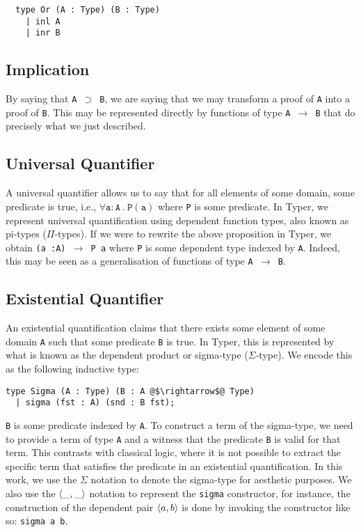 \documentclass[12pt,twoside,maitrise]{dms}
\theoremstyle{definition}
\numberwithin{equation}{section}
\numberwithin{table}{chapter}
\numberwithin{figure}{chapter}
\newcommand\id[1] {\texttt{#1}}
\newcommand\fn[1] {\texttt{#1}}
\begin{document}
\begin{verbatim}
  type Or (A : Type) (B : Type)
    | inl A
    | inr B
\end{verbatim}

\subsection*{Implication}

By saying that \fn{A $\supset$ B}, we are saying that we may transform a proof
of \id{A} into a proof of \id{B}. This may be represented directly by functions
of type \fn{A $\rightarrow$ B} that do precisely what we just described.

\subsection*{Universal Quantifier}

A universal quantifier allows us to say that for all elements of some domain,
some predicate is true, i.e., $\forall \id{a} : \id{A} \ . \ \id{P}(\id{a})$ where
\id{P} is some predicate. In Typer, we represent universal quantification using
dependent function types, also known as pi-types ($\Pi$-types). If we were to
rewrite the above proposition in Typer, we obtain \fn{(a :\@ A) $\rightarrow$ P
a} where \id{P} is some dependent type indexed by \id{A}. Indeed, this
may be seen as a generalisation of functions of type \id{A $\rightarrow$ B}.

\subsection*{Existential Quantifier}\label{subsec:existential-sigma}

An existential quantification claims that there exists some element of some
domain \id{A} such that some predicate \id{B} is true. In Typer, this is
represented by what is known as the dependent product or sigma-type
($\Sigma$-type). We encode this as the following inductive type:

\begin{verbatim}
type Sigma (A : Type) (B : A @$\rightarrow$@ Type)
  | sigma (fst : A) (snd : B fst);
\end{verbatim}

\id{B} is some predicate indexed by \id{A}. To construct a term of the
sigma-type, we need to provide a term of type \id{A} and a witness that the
predicate \id{B} is valid for that term. This contrasts with classical logic,
where it is not possible to extract the specific term that satisfies the
predicate in an existential quantification. In this work, we use the $\Sigma$
notation to denote the sigma-type for aesthetic purposes. We also use the
$\braket{\_, \_}$ notation to represent the \id{sigma} constructor, for
instance, the construction of the dependent pair $\braket{a, b}$ is done by
invoking the constructor like so: \fn{sigma a b}.
\end{document}
